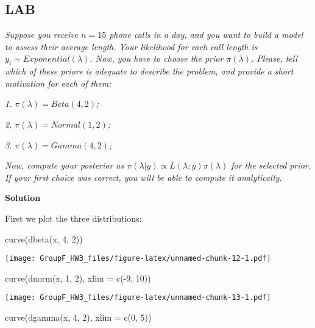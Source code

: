 \documentclass[
]{article}
\newenvironment{Shaded}{\begin{snugshade}}{\end{snugshade}}
\newcommand{\AttributeTok}[1]{\textcolor[rgb]{0.77,0.63,0.00}{#1}}
\newcommand{\DecValTok}[1]{\textcolor[rgb]{0.00,0.00,0.81}{#1}}
\newcommand{\FunctionTok}[1]{\textcolor[rgb]{0.00,0.00,0.00}{#1}}
\newcommand{\NormalTok}[1]{#1}
\newcommand{\SpecialCharTok}[1]{\textcolor[rgb]{0.00,0.00,0.00}{#1}}
\begin{document}
\hypertarget{lab}{%
\subsection{LAB}\label{lab}}

\emph{Suppose you receive \(n=15\) phone calls in a day, and you want to
build a model to assess their average length. Your likelihood for each
call length is \(y_i\sim Exponential\left(\lambda\right)\). Now, you
have to choose the prior \(\pi\left(\lambda\right)\). Please, tell which
of these priors is adequate to describe the problem, and provide a short
motivation for each of them:}

\emph{1. \(\pi\left(\lambda\right) = Beta\left(4,2\right)\);}

\emph{2. \(\pi\left(\lambda\right) = Normal\left(1,2\right)\);}

\emph{3. \(\pi\left(\lambda\right) = Gamma\left(4,2\right)\);}

\emph{Now, compute your posterior as
\(\pi\left(\lambda|y\right)\propto L\left(\lambda;y\right)\pi\left(\lambda\right)\)
for the selected prior. If your first choice was correct, you will be
able to compute it analytically.}

\textbf{Solution}

First we plot the three distributions:

\begin{Shaded}
\begin{Highlighting}[]
\FunctionTok{curve}\NormalTok{(}\FunctionTok{dbeta}\NormalTok{(x, }\DecValTok{4}\NormalTok{, }\DecValTok{2}\NormalTok{))}
\end{Highlighting}
\end{Shaded}

\texttt{[image: GroupF\_HW3\_files/figure-latex/unnamed-chunk-12-1.pdf]}

\begin{Shaded}
\begin{Highlighting}[]
\FunctionTok{curve}\NormalTok{(}\FunctionTok{dnorm}\NormalTok{(x, }\DecValTok{1}\NormalTok{, }\DecValTok{2}\NormalTok{), }\AttributeTok{xlim =} \FunctionTok{c}\NormalTok{(}\SpecialCharTok{{-}}\DecValTok{9}\NormalTok{, }\DecValTok{10}\NormalTok{))}
\end{Highlighting}
\end{Shaded}

\texttt{[image: GroupF\_HW3\_files/figure-latex/unnamed-chunk-13-1.pdf]}

\begin{Shaded}
\begin{Highlighting}[]
\FunctionTok{curve}\NormalTok{(}\FunctionTok{dgamma}\NormalTok{(x, }\DecValTok{4}\NormalTok{, }\DecValTok{2}\NormalTok{), }\AttributeTok{xlim =} \FunctionTok{c}\NormalTok{(}\DecValTok{0}\NormalTok{, }\DecValTok{5}\NormalTok{))}
\end{Highlighting}
\end{Shaded}
\end{document}
